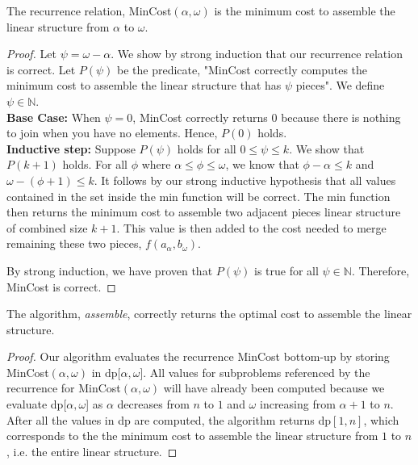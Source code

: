 \documentclass[11pt]{scrartcl}
\begin{document}
	\begin{theorem*}
		The recurrence relation, MinCost$(\alpha,\omega)$ is the minimum cost to assemble the linear structure from $\alpha$ to $\omega$.
		\begin{proof}
			Let $\psi = \omega - \alpha$.
			We show by strong induction that our recurrence relation is correct. Let $P(\psi)$ be the predicate,
			"MinCost correctly computes the minimum cost to assemble the linear structure that has $\psi$ pieces".
			We define $\psi \in \mathbb{N}$. \\
			\textbf{Base Case:} When $\psi = 0$, MinCost correctly returns 0 because there is
			nothing to join when you have no elements. Hence, $P(0)$ holds.\\
			\textbf{Inductive step:} Suppose $P(\psi)$ holds for all $0 \leq \psi \leq k$. We show that $P(k + 1)$ holds.
			For all $\phi$ where $\alpha \leq \phi \leq \omega$, we know that $\phi - \alpha \leq k$ and $\omega - (\phi + 1) \leq k$.
			It follows by our strong inductive hypothesis that all values contained in the set inside the min function will be correct.
			The min function then returns the minimum cost to assemble two adjacent pieces linear structure of combined size $k + 1$.
			This value is then added to the cost needed to merge remaining these two pieces, $f(a_\alpha,b_\omega)$.
			\par By strong induction, we have proven that $P(\psi)$ is true for all $\psi  \in \mathbb{N}$.
			Therefore, MinCost is correct.
		\end{proof}
	\end{theorem*}

	\begin{corollary*}
		The algorithm, \textit{assemble}, correctly returns the optimal cost to assemble the linear structure.

		\begin{proof}
			Our algorithm evaluates the recurrence MinCost bottom-up by storing MinCost$(\alpha,\omega)$ in dp[$\alpha,\omega$].
			All values for subproblems referenced by the recurrence for MinCost$(\alpha,\omega)$ will have already been computed
			because we evaluate dp[$\alpha,\omega$] as $\alpha$ decreases from $n$ to $1$ and $\omega$ increasing from $\alpha + 1$ to $n$.
			After all the values in dp are computed, the algorithm returns dp$[1, n]$,
			which corresponds to the the minimum cost to assemble the linear structure from $1$ to $n$, i.e. the entire linear
			structure.
		\end{proof}

	\end{corollary*}
\end{document}
